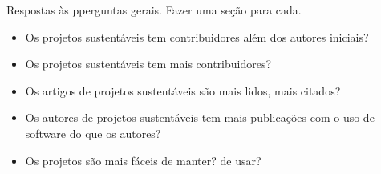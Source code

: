  \label{discussao}

Respostas às pperguntas gerais. Fazer uma seção para cada.

\begin{itemize}
  \item Os projetos sustentáveis tem contribuidores além dos autores iniciais?
  \item Os projetos sustentáveis tem mais contribuidores?
  \item Os artigos de projetos sustentáveis são mais lidos, mais citados?
  \item Os autores de projetos sustentáveis tem mais publicações com o uso de software do que os autores?
  \item Os projetos são mais fáceis de manter? de usar?
\end{itemize}
